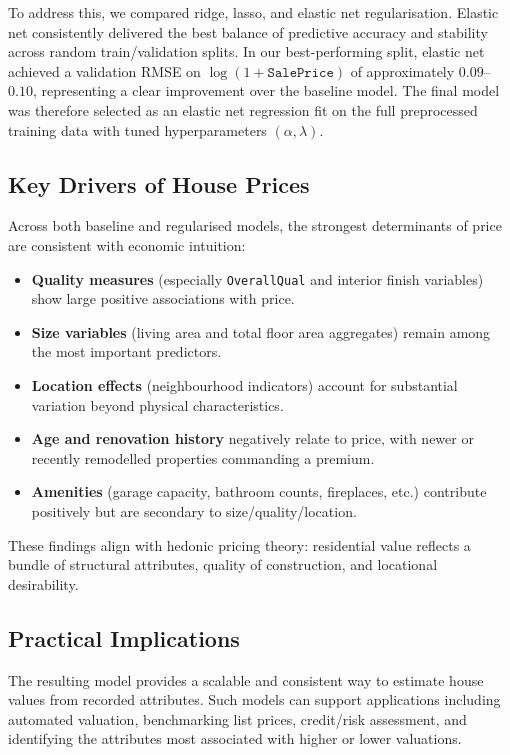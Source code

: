 \documentclass[12pt,oneside]{article} %
\begin{document}
\noindent
To address this, we compared ridge, lasso, and elastic net regularisation. Elastic net consistently delivered the best balance of predictive accuracy and stability across random train/validation splits. In our best-performing split, elastic net achieved a validation RMSE on $\log(1+\texttt{SalePrice})$ of approximately $0.09$--$0.10$, representing a clear improvement over the baseline model. The final model was therefore selected as an elastic net regression fit on the full preprocessed training data with tuned hyperparameters $(\alpha,\lambda)$.

\subsection{Key Drivers of House Prices}

Across both baseline and regularised models, the strongest determinants of price are consistent with economic intuition:
\begin{itemize}
    \item \textbf{Quality measures} (especially \texttt{OverallQual} and interior finish variables) show large positive associations with price.
    \item \textbf{Size variables} (living area and total floor area aggregates) remain among the most important predictors.
    \item \textbf{Location effects} (neighbourhood indicators) account for substantial variation beyond physical characteristics.
    \item \textbf{Age and renovation history} negatively relate to price, with newer or recently remodelled properties commanding a premium.
    \item \textbf{Amenities} (garage capacity, bathroom counts, fireplaces, etc.) contribute positively but are secondary to size/quality/location.
\end{itemize}
These findings align with hedonic pricing theory: residential value reflects a bundle of structural attributes, quality of construction, and locational desirability.

\subsection{Practical Implications}

The resulting model provides a scalable and consistent way to estimate house values from recorded attributes. Such models can support applications including automated valuation, benchmarking list prices, credit/risk assessment, and identifying the attributes most associated with higher or lower valuations.
\end{document}
